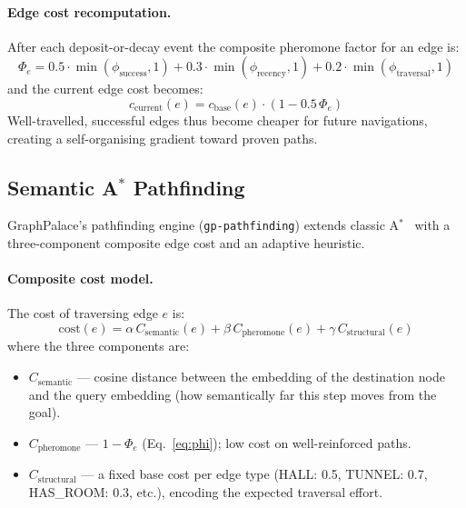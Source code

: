 \documentclass[11pt,a4paper]{article}
\begin{document}
\paragraph{Edge cost recomputation.}
After each deposit-or-decay event the composite pheromone factor for an edge is:
\begin{equation}
\Phi_e = 0.5 \cdot \min(\phi_{\text{success}}, 1)
       + 0.3 \cdot \min(\phi_{\text{recency}}, 1)
       + 0.2 \cdot \min(\phi_{\text{traversal}}, 1)
\label{eq:phi}
\end{equation}
and the current edge cost becomes:
\begin{equation}
c_{\text{current}}(e) = c_{\text{base}}(e) \cdot (1 - 0.5\,\Phi_e)
\label{eq:edgecost}
\end{equation}
Well-travelled, successful edges thus become cheaper for future navigations,
creating a self-organising gradient toward proven paths.

\subsection{Semantic A$^*$ Pathfinding}
\label{sec:astar}

GraphPalace's pathfinding engine (\texttt{gp-pathfinding}) extends classic
A$^*$~\cite{hart1968} with a three-component composite edge cost and an
adaptive heuristic.

\paragraph{Composite cost model.}
The cost of traversing edge $e$ is:
\begin{equation}
\text{cost}(e) = \alpha\,C_{\text{semantic}}(e)
               + \beta\,C_{\text{pheromone}}(e)
               + \gamma\,C_{\text{structural}}(e)
\label{eq:astar_cost}
\end{equation}
where the three components are:
\begin{itemize}[nosep]
\item $C_{\text{semantic}}$ --- cosine distance between the embedding of the
      destination node and the query embedding (how semantically far this step
      moves from the goal).
\item $C_{\text{pheromone}}$ --- $1 - \Phi_e$ (Eq.~\ref{eq:phi}); low cost on
      well-reinforced paths.
\item $C_{\text{structural}}$ --- a fixed base cost per edge type
      (HALL: 0.5, TUNNEL: 0.7, HAS\_ROOM: 0.3, etc.), encoding the
      expected traversal effort.
\end{itemize}
\end{document}
